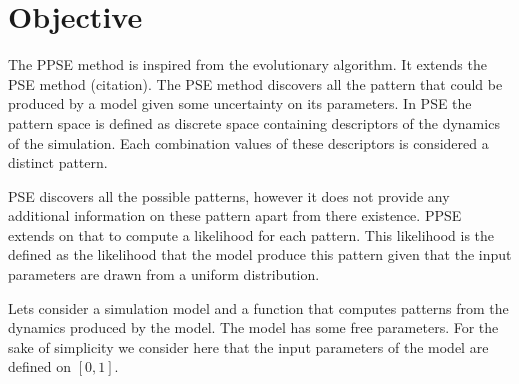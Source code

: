 \documentclass[10pt,a4paper]{article}
\theoremstyle{definition}
\theoremstyle{remark}
\begin{document}
%
%
%


\section{Objective}\label{sec. objective}

The PPSE method is inspired from the evolutionary algorithm. It extends the PSE method (citation). The PSE method discovers all the pattern that could be produced by a model given some uncertainty on its parameters. In PSE the pattern space is defined as discrete space containing descriptors of the dynamics of the simulation. Each combination values of these descriptors is considered a distinct pattern.

PSE discovers all the possible patterns, however it does not provide any additional information on these pattern apart from there existence. PPSE extends on that to compute a likelihood for each pattern. This likelihood is the defined as the likelihood that the model produce this pattern given that the input parameters are drawn from a uniform distribution.

Lets consider a simulation model and a function that computes patterns from the dynamics produced by the model. The model has some free parameters. For the sake of simplicity we consider here that the input parameters of the model are defined on $[0, 1]$.
\end{document}
